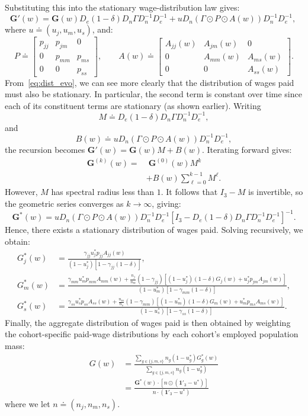 \documentclass{article}
\begin{document}
Substituting this into the stationary wage-distribution law gives:
\begin{equation}
\mathbf G'(w)
=
\mathbf G(w)D_e(1-\delta)D_n\Gamma D_n^{-1}D_e^{-1}
+
uD_n
\left(\Gamma\odot P\odot A(w)\right)
D_n^{-1}D_e^{-1},
~\label{eq:dist_evo}
\end{equation}
where $u\doteq(u_j,u_m,u_s)$, and:
\[
P\doteq
\begin{bmatrix}
p_{jj} & p_{jm} & 0\\
0 & p_{mm} & p_{ms}\\
0 & 0 & p_{ss}
\end{bmatrix},
\qquad
A(w)\doteq
\begin{bmatrix}
A_{jj}(w) & A_{jm}(w) & 0\\
0 & A_{mm}(w) & A_{ms}(w)\\
0 & 0 & A_{ss}(w)
\end{bmatrix}.
\]
From~\eqref{eq:dist_evo}, we can see more clearly that the distribution of wages paid must also be stationary. In particular, the second term is constant over time since each of its constituent terms are stationary (as shown earlier). Writing
\[
M \doteq D_e(1-\delta)D_n\Gamma D_n^{-1}D_e^{-1},
\]
and
\[
B(w)\doteq uD_n
\left(\Gamma\odot P\odot A(w)\right)
D_n^{-1}D_e^{-1},
\]
the recursion becomes $\mathbf G'(w)=\mathbf G(w)M+B(w)$. Iterating forward gives:
\begin{align*}
\mathbf G^{(k)}(w)
=&\;
\mathbf G^{(0)}(w)M^k\\
&+
B(w)\sum_{\ell=0}^{k-1}M^\ell.
\end{align*}
However, $M$ has spectral radius less than $1$. It follows that $I_3-M$ is invertible, so the geometric series converges as $k\to\infty$, giving:
\[
\mathbf{G}^*(w)=uD_n
\left(\Gamma\odot P\odot A(w)\right)
D_n^{-1}D_e^{-1}
\left[
I_3-D_e(1-\delta)D_n\Gamma D_n^{-1}D_e^{-1}
\right]^{-1}.
\]
Hence, there exists a stationary distribution of wages paid. Solving recursively, we obtain:
\begin{align*}
G_j^*(w)
&=
\frac{
\gamma_{jj}u_j^*p_{jj}A_{jj}(w)
}{
(1-u_j^*)\left[1-\gamma_{jj}(1-\delta)\right]
},
\\
G_m^*(w)
&=
\frac{
\gamma_{mm}u_m^*p_{mm}A_{mm}(w)
+\frac{n_j}{n_m}(1-\gamma_{jj})
\left[
(1-u_j^*)(1-\delta)G_j(w)+u_j^*p_{jm}A_{jm}(w)
\right]
}{
(1-u_m^*)\left[1-\gamma_{mm}(1-\delta)\right]
},
\\
G_s^*(w)
&=
\frac{
\gamma_{ss}u_s^*p_{ss}A_{ss}(w)
+\frac{n_m}{n_s}(1-\gamma_{mm})
\left[
(1-u_m^*)(1-\delta)G_m(w)+u_m^*p_{ms}A_{ms}(w)
\right]
}{
(1-u_s^*)\left[1-\gamma_{ss}(1-\delta)\right]
}.
\end{align*}
Finally, the aggregate distribution of wages paid is then obtained by weighting the cohort-specific paid-wage distributions by each cohort's employed population
mass:
\begin{align*}
G(w)
&=
\frac{
\sum_{g\in\{j,m,s\}} n_g(1-u_g^*)G_g^*(w)
}{
\sum_{g\in\{j,m,s\}} n_g(1-u_g^*)
}\\
&=\frac{\mathbf{G}^*(w)\cdot[n\odot(\mathbf{1}'_3-u^*)]}{n\cdot(\mathbf{1}'_3-u^*)}
\end{align*}
where we let $n\doteq(n_j,n_m,n_s)$.
\end{document}
